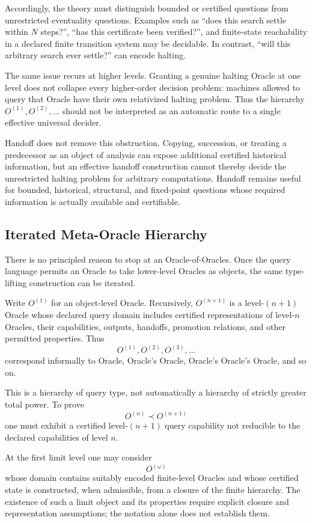\documentclass[11pt]{article}
\begin{document}
Accordingly, the theory must distinguish bounded or certified questions from unrestricted eventuality questions. Examples such as ``does this search settle within $N$ steps?'', ``has this certificate been verified?'', and finite-state reachability in a declared finite transition system may be decidable. In contrast, ``will this arbitrary search ever settle?'' can encode halting.

The same issue recurs at higher levels. Granting a genuine halting Oracle at one level does not collapse every higher-order decision problem: machines allowed to query that Oracle have their own relativized halting problem. Thus the hierarchy $O^{(1)},O^{(2)},\ldots$ should not be interpreted as an automatic route to a single effective universal decider.

Handoff does not remove this obstruction. Copying, succession, or treating a predecessor as an object of analysis can expose additional certified historical information, but an effective handoff construction cannot thereby decide the unrestricted halting problem for arbitrary computations. Handoff remains useful for bounded, historical, structural, and fixed-point questions whose required information is actually available and certifiable.

\subsection{Iterated Meta-Oracle Hierarchy}
There is no principled reason to stop at an Oracle-of-Oracles. Once the query language permits an Oracle to take lower-level Oracles as objects, the same type-lifting construction can be iterated.

Write $O^{(1)}$ for an object-level Oracle. Recursively, $O^{(n+1)}$ is a level-$(n+1)$ Oracle whose declared query domain includes certified representations of level-$n$ Oracles, their capabilities, outputs, handoffs, promotion relations, and other permitted properties. Thus
\[
O^{(1)},O^{(2)},O^{(3)},\ldots
\]
correspond informally to Oracle, Oracle's Oracle, Oracle's Oracle's Oracle, and so on.

This is a hierarchy of query type, not automatically a hierarchy of strictly greater total power. To prove
\[
O^{(n)}\prec O^{(n+1)}
\]
one must exhibit a certified level-$(n+1)$ query capability not reducible to the declared capabilities of level $n$.

At the first limit level one may consider
\[
O^{(\omega)}
\]
whose domain contains suitably encoded finite-level Oracles and whose certified state is constructed, when admissible, from a closure of the finite hierarchy. The existence of such a limit object and its properties require explicit closure and representation assumptions; the notation alone does not establish them.
\end{document}

